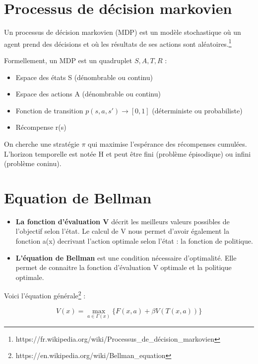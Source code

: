 \documentclass{article}
\begin{document}
\section{Processus de décision markovien}

Un processus de décision markovien (MDP) est un modèle stochastique où un agent prend des décisions et où les résultats de ses actions sont aléatoires.\footnote{https://fr.wikipedia.org/wiki/Processus\_de\_décision\_markovien}

Formellement, un MDP est un quadruplet ${S, A, T, R}$ :
\begin{itemize}
\item Espace des états S (dénombrable ou continu)
\item Espace des actions A (dénombrable ou continu)
\item Fonction de transition $p(s, a, s') \rightarrow [0, 1]$ (déterministe ou probabiliste)
\item Récompense r(s)
\end{itemize}

On cherche une stratégie $\pi$ qui maximise l'espérance des récompenses cumulées.\\
L'horizon temporelle est notée H et peut être fini (problème épisodique) ou infini (problème coninu).

\section{Equation de Bellman}

\begin{itemize}

\item \textbf{La fonction d'évaluation V} décrit les meilleurs valeurs possibles de l'objectif selon l'état. Le calcul de V nous permet d'avoir également la fonction a(x) decrivant l'action optimale selon l'état : la fonction de politique.

\item \textbf{L'équation de Bellman} est une condition nécessaire d'optimalité. Elle permet de connaitre la fonction d'évaluation V optimale et la politique optimale. 

\end{itemize}
Voici l'équation générale\footnote{https://en.wikipedia.org/wiki/Bellman\_equation} :

\[ V(x) = \max_{a \in \Gamma (x) } \{ F(x,a) + \beta V(T(x,a)) \} \]
\end{document}
